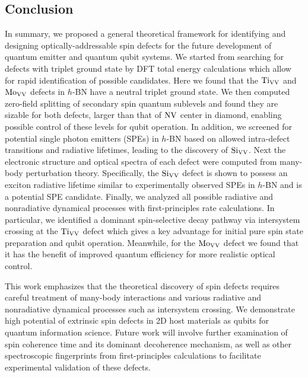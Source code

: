 \subsection{Conclusion}
In summary, we proposed a general theoretical framework for identifying and designing optically-addressable spin defects for the future development of quantum emitter and quantum qubit systems.
We started from searching for defects with triplet ground state by DFT total energy calculations which allow for rapid identification of possible candidates. Here we found that the $\text{Ti}_{\text{V}\text{V}}$ and $\text{Mo}_{\text{V}\text{V}}$ defects in $h$-BN have a neutral triplet ground state. We then
computed zero-field splitting of secondary spin quantum sublevels and found they are sizable for both defects, larger than that of $\text{NV}$ center in diamond, enabling possible control of these levels for qubit operation.
In addition, we screened for potential single photon emitters (SPEs) in $h$-BN based on allowed intra-defect transitions and radiative lifetimes, leading to the discovery of $\text{Si}_{\text{V}\text{V}}$.
Next the electronic structure and optical spectra of each defect were computed from many-body perturbation theory.
Specifically, the $\text{Si}_{\text{V}\text{V}}$ defect is shown to possess an exciton radiative lifetime similar to experimentally observed SPEs in $h$-BN and is a potential SPE candidate.
Finally, we analyzed all possible radiative and nonradiative dynamical processes with first-principles rate calculations. In particular, we identified a dominant spin-selective decay pathway via intersystem crossing at the $\text{Ti}_{\text{V}\text{V}}$ defect which gives a key advantage for initial pure spin state preparation and qubit operation.
Meanwhile, for the $\text{Mo}_{\text{V}\text{V}}$ defect we found that it has the benefit of improved quantum efficiency for more realistic optical control.


This work emphasizes that the theoretical discovery of spin defects requires careful treatment of many-body interactions and various radiative and nonradiative dynamical processes such as intersystem crossing.
We demonstrate high potential of extrinsic spin defects in 2D host materials as qubits for quantum information science.
Future work will involve further examination of spin coherence time and its dominant decoherence mechanism,
as well as other spectroscopic fingerprints from first-principles calculations to facilitate experimental validation of these defects.


